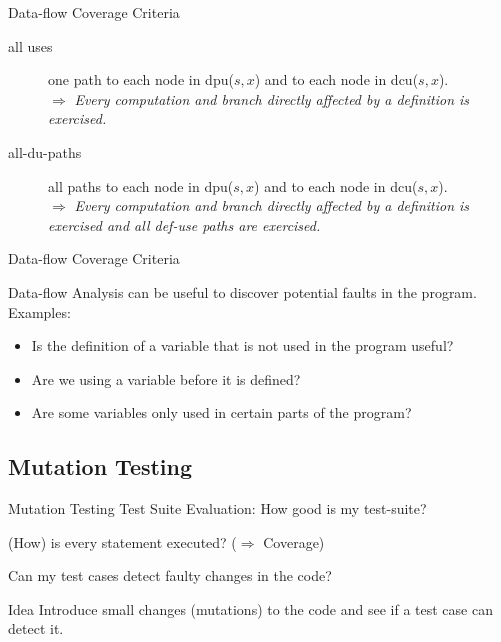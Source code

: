 \begin{Frame}{Data-flow Coverage Criteria}
  \begin{description}
    \item[all uses] one path to each node in dpu($s,x$) and to each node in dcu($s,x$).\\
	$\Rightarrow$ \textit{Every computation and branch directly affected by a definition is exercised.}
    \item[all-du-paths] all paths to each node in dpu($s,x$) and to each node in dcu($s,x$).\\
    $\Rightarrow$ \textit{Every computation and branch directly affected by a definition is exercised and all def-use paths are exercised.}
  \end{description}
\end{Frame}

\begin{Frame}{Data-flow Coverage Criteria}

	Data-flow Analysis can be useful to discover potential faults in the program.\\
	\xxx
	Examples:
	\begin{itemize}
		\item Is the definition of a variable that is not used in the program useful?
		\item Are we using a variable before it is defined? 
		\item Are some variables only used in certain parts of the program?
	\end{itemize}

\end{Frame}


\subsection{Mutation Testing}

\begin{frame}{Mutation Testing}
	Test Suite Evaluation: How good is my test-suite?
	\begin{beameritemize}
		\item (How) is every statement executed? ($\Rightarrow$ Coverage)
		\item Can my test cases detect faulty changes in the code?
	\end{beameritemize}	
	\xxx
	\begin{block}{Idea}
		Introduce small changes (mutations) to the code and see if a test case can detect it.
	\end{block}	
\end{frame}


